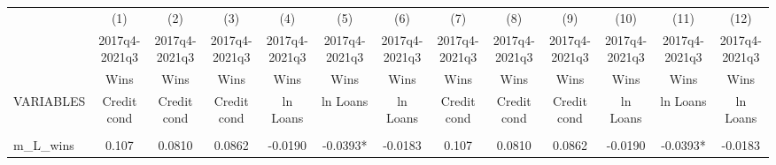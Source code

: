 \documentclass[]{article}
\begin{document}
\begin{center}
\begin{tabular}{lcccccccccccc} \hline
 & (1) & (2) & (3) & (4) & (5) & (6) & (7) & (8) & (9) & (10) & (11) & (12) \\
 & 2017q4-2021q3 & 2017q4-2021q3 & 2017q4-2021q3 & 2017q4-2021q3 & 2017q4-2021q3 & 2017q4-2021q3 & 2017q4-2021q3 & 2017q4-2021q3 & 2017q4-2021q3 & 2017q4-2021q3 & 2017q4-2021q3 & 2017q4-2021q3 \\
 & Wins & Wins & Wins & Wins & Wins & Wins & Wins & Wins & Wins & Wins & Wins & Wins \\
VARIABLES & Credit cond & Credit cond & Credit cond & ln Loans & ln Loans & ln Loans & Credit cond & Credit cond & Credit cond & ln Loans & ln Loans & ln Loans \\ \hline
\vspace{4pt} & \begin{footnotesize}\end{footnotesize} & \begin{footnotesize}\end{footnotesize} & \begin{footnotesize}\end{footnotesize} & \begin{footnotesize}\end{footnotesize} & \begin{footnotesize}\end{footnotesize} & \begin{footnotesize}\end{footnotesize} & \begin{footnotesize}\end{footnotesize} & \begin{footnotesize}\end{footnotesize} & \begin{footnotesize}\end{footnotesize} & \begin{footnotesize}\end{footnotesize} & \begin{footnotesize}\end{footnotesize} & \begin{footnotesize}\end{footnotesize} \\
m\_L\_wins & 0.107 & 0.0810 & 0.0862 & -0.0190 & -0.0393* & -0.0183 & 0.107 & 0.0810 & 0.0862 & -0.0190 & -0.0393* & -0.0183 \\

\end{tabular}
\end{center}
\end{document}
